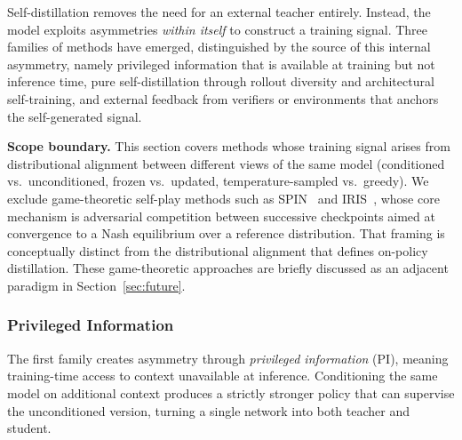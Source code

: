 \documentclass{article} %
\begin{document}
Self-distillation removes the need for an external teacher entirely. Instead, the model exploits asymmetries \emph{within itself} to construct a training signal. Three families of methods have emerged, distinguished by the source of this internal asymmetry, namely privileged information that is available at training but not inference time, pure self-distillation through rollout diversity and architectural self-training, and external feedback from verifiers or environments that anchors the self-generated signal.

\textbf{Scope boundary.} This section covers methods whose training signal arises from distributional alignment between different views of the same model (conditioned vs.\ unconditioned, frozen vs.\ updated, temperature-sampled vs.\ greedy). We exclude game-theoretic self-play methods such as SPIN~\citep{2401.01335} and IRIS~\citep{2604.20933}, whose core mechanism is adversarial competition between successive checkpoints aimed at convergence to a Nash equilibrium over a reference distribution. That framing is conceptually distinct from the distributional alignment that defines on-policy distillation. These game-theoretic approaches are briefly discussed as an adjacent paradigm in Section~\ref{sec:future}.

\subsubsection{Privileged Information}
\label{subsec:self_pi}

The first family creates asymmetry through \emph{privileged information} (PI), meaning training-time access to context unavailable at inference. Conditioning the same model on additional context produces a strictly stronger policy that can supervise the unconditioned version, turning a single network into both teacher and student.
\end{document}
